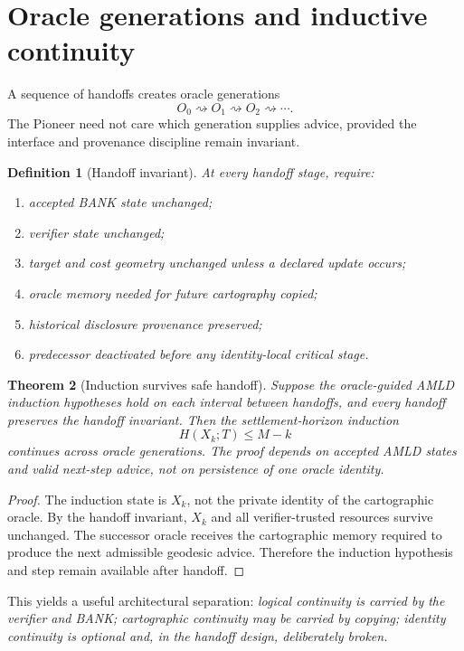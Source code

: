 \documentclass[11pt]{article}
\newtheorem{definition}{Definition}[section]
\newtheorem{theorem}[definition]{Theorem}
\theoremstyle{remark}
\begin{document}
\section{Oracle generations and inductive continuity}

A sequence of handoffs creates oracle generations
\[
O_0\rightsquigarrow O_1\rightsquigarrow O_2\rightsquigarrow\cdots.
\]
The Pioneer need not care which generation supplies advice, provided the interface and provenance discipline remain invariant.

\begin{definition}[Handoff invariant]
At every handoff stage, require:
\begin{enumerate}[label=(\alph*)]
\item accepted BANK state unchanged;
\item verifier state unchanged;
\item target and cost geometry unchanged unless a declared update occurs;
\item oracle memory needed for future cartography copied;
\item historical disclosure provenance preserved;
\item predecessor deactivated before any identity-local critical stage.
\end{enumerate}
\end{definition}

\begin{theorem}[Induction survives safe handoff]
Suppose the oracle-guided AMLD induction hypotheses hold on each interval between handoffs, and every handoff preserves the handoff invariant. Then the settlement-horizon induction
\[
H(X_k;T)\le M-k
\]
continues across oracle generations. The proof depends on accepted AMLD states and valid next-step advice, not on persistence of one oracle identity.
\end{theorem}
\begin{proof}
The induction state is $X_k$, not the private identity of the cartographic oracle. By the handoff invariant, $X_k$ and all verifier-trusted resources survive unchanged. The successor oracle receives the cartographic memory required to produce the next admissible geodesic advice. Therefore the induction hypothesis and step remain available after handoff.
\end{proof}

This yields a useful architectural separation: \emph{logical continuity is carried by the verifier and BANK; cartographic continuity may be carried by copying; identity continuity is optional and, in the handoff design, deliberately broken.}
\end{document}

